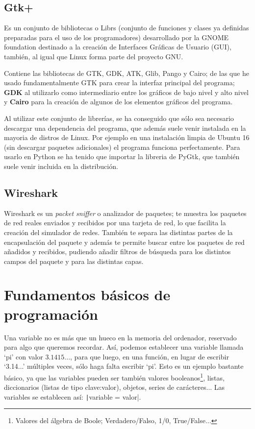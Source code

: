 \documentclass[a4paper, 11pt]{report} %
\begin{document}
\subsection{Gtk+}
Es un conjunto de bibliotecas o \glspl{Libr} (conjunto de funciones y clases ya definidas preparadas para el uso de los programadores) desarrollado por la GNOME foundation destinado a la creación de Interfaces Gráficas de Usuario (\acrshort{GUI}), también, al igual que Linux forma parte del proyecto GNU.

Contiene las bibliotecas de GTK, GDK, ATK, Glib, Pango y Cairo; de las que he usado fundamentalmente GTK para crear la interfaz principal del programa; \textbf{GDK} al utilizarlo como intermediario entre los gráficos de bajo nivel y alto nivel y \textbf{Cairo} para la creación de algunos de los elementos gráficos del programa.

Al utilizar este conjunto de librerías, se ha conseguido que sólo sea necesario descargar una dependencia del programa, que además suele venir instalada en la mayoria de distros de Linux. Por ejemplo en una instalación limpia de Ubuntu 16 (sin descargar paquetes adicionales) el programa funciona perfectamente. Para usarlo en Python se ha tenido que importar la libreria de PyGtk, que también suele venir incluida en la distribución.

\subsection{Wireshark}
\label{wireshark}
Wireshark es un \textit{packet sniffer} o analizador de paquetes; te muestra los paquetes de red reales enviados y recibidos por una tarjeta de red, lo que facilita la creación del simulador de redes. También te separa las distintas partes de la encapsulación del paquete y además te permite buscar entre los paquetes de red añadidos y recibidos, pudiendo añadir filtros de búsqueda para los distintos campos del paquete y para las distintas capas.

\newpage
\section{Fundamentos básicos de programación}
Una variable no es más que un hueco en la memoria del ordenador, reservado para algo que queremos recordar. Así, podemos establecer una variable llamada `pi' con valor $\mathsf{3.1415...}$, para que luego, en una función, en lugar de escribir `3.14...' múltiples veces, sólo haga falta escribir `pi'. Esto es un ejemplo bastante básico, ya que las variables pueden ser también valores booleanos\footnote{Valores del álgebra de Boole; Verdadero/Falso, 1/0, True/False...}, listas, diccionarios (listas de tipo clave:valor), objetos, series de carácteres...
Las variables se establecen así: \texttt|variable = valor|.
\end{document}
